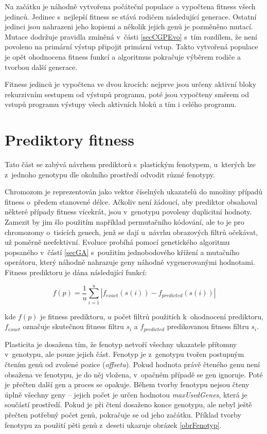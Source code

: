 Na začátku je náhodně vytvořena počáteční populace a vypočtena fitness všech jedinců. Jedinec s~nejlepší fitness se stává rodičem následující generace. Ostatní jedinci jsou nahrazeni jeho kopiemi a několik jejich genů je pozměněno mutací. Mutace dodržuje pravidla zmíněná v~části \ref{secCGPEvo} s~tím rozdílem, že není povoleno na primární výstup připojit primární vstup. Takto vytvořená populace je opět ohodnocena fitness funkcí a algoritmus pokračuje výběrem rodiče a tvorbou další generace.

Fitness jedinců je vypočtena ve dvou krocích: nejprve jsou určeny aktivní bloky rekurzivním sestupem od výstupů programu, poté jsou vypočteny směrem od vstupů programu výstupy všech aktivních bloků a tím i celého programu.

\section{Prediktory fitness}
\label{secDesignPred}

Tato část se zabývá návrhem prediktorů s~plastickým fenotypem, u~kterých lze z~jednoho genotypu dle okolního prostředí odvodit různé fenotypy.

Chromozom je reprezentován jako vektor číselných ukazatelů do množiny případů fitness o~předem stanovené délce. Ačkoliv není žádoucí, aby prediktor obsahoval některé případy fitness vícekrát, jsou v~genotypu povoleny duplicitní hodnoty. Zamezit by jim šlo použitím například permutačního kódování, ale to je pro chromozomy o~tisících genech, jenž se dají u~návrhu obrazových filtrů očekávat, už poměrně neefektivní. Evoluce probíhá pomocí genetického algoritmu popsaného v~částí \ref{secGA} s~použitím jednobodového křížení a mutačního operátoru, který náhodně nahrazuje geny náhodně vygenerovanými hodnotami. Fitness prediktoru je dána následující funkcí:

\begin{equation}
    \label{eqDesignPredFitness}
    f \left( p \right) = \frac{1}{u} \sum\limits_{i=1}^{u} \left| f_{\mathit{exact}} \left( s \left( i \right) \right) - f_{\mathit{predicted}} \left( s \left( i \right) \right) \right|
\end{equation}

\noindent{}kde $f \left( p \right)$ je fitness prediktoru, $u$ počet filtrů použitích k~ohodnocení prediktoru, $f_{\mathit{exact}}$ označuje skutečnou fitness filtru $s_i$ a $f_{\mathit{predicted}}$ predikovanou fitness filtru $s_i$.

Plasticita je dosažena tím, že fenotyp netvoří všechny ukazatele přítomny v~genotypu, ale pouze jejich část. Fenotyp je z~genotypu tvořen postupným čtením genů od zvolené pozice (\emph{offsetu}). Pokud hodnota právě čteného genu není obsažena ve fenotypu, je do něj vložena, v~opačném případě se gen ignoruje. Poté je přečten další gen a proces se opakuje. Během tvorby fenotypu nejsou čteny úplně všechny geny -- jejich počet je určen hodnotou \emph{maxUsedGenes}, která je součástí prostředí. Pokud je při čtení dosaženo konce genotypu, ale nebyl ještě přečten potřebný počet genů, pokračuje se od jeho začátku. Příklad tvorby fenotypu za použití pěti genů z~deseti ukazuje obrázek \ref{obrFenotyp}.


